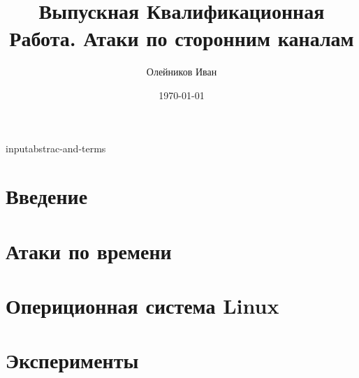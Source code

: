 \documentclass[11pt,twoside,a4paper]{report}
\begin{document}
\title{Выпускная Квалификационная Работа. Атаки по сторонним каналам}
\author{Олейников Иван}
\date{\today}
\maketitle

\tableofcontents

input{abstrac-and-terms}

\chapter*{Введение}


\chapter{Атаки по времени}


\chapter{Опериционная система Linux}


\chapter{Эксперименты}



 
\end{document}

